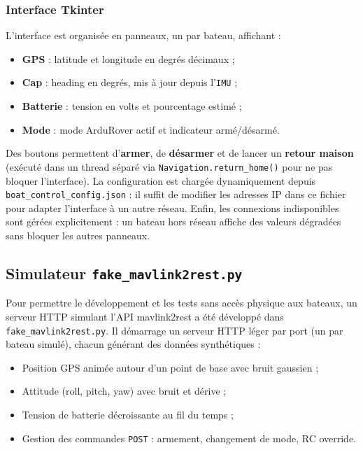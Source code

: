 \subsubsection{Interface Tkinter}

L'interface est organisée en panneaux, un par bateau, affichant :
\begin{itemize}
  \item \textbf{GPS} : latitude et longitude en degrés décimaux ;
  \item \textbf{Cap} : heading en degrés, mis à jour depuis l'\texttt{IMU} ;
  \item \textbf{Batterie} : tension en volts et pourcentage estimé ;
  \item \textbf{Mode} : mode ArduRover actif et indicateur armé/désarmé.
\end{itemize}

Des boutons permettent d'\textbf{armer}, de \textbf{désarmer} et de lancer un \textbf{retour maison} (exécuté dans un thread séparé via \texttt{Navigation.return\_home()} pour ne pas bloquer l'interface). La configuration est chargée dynamiquement depuis \texttt{boat\_control\_config.json} : il suffit de modifier les adresses IP dans ce fichier pour adapter l'interface à un autre réseau. Enfin, les connexions indisponibles sont gérées explicitement : un bateau hors réseau affiche des valeurs dégradées sans bloquer les autres panneaux.

\subsection{Simulateur \texttt{fake\_mavlink2rest.py}}
\label{sec:bblib:fake}

Pour permettre le développement et les tests sans accès physique aux bateaux, un serveur HTTP simulant l'API mavlink2rest a été développé dans \texttt{fake\_mavlink2rest.py}. Il démarrage un serveur HTTP léger par port (un par bateau simulé), chacun générant des données synthétiques :
\begin{itemize}
  \item Position GPS animée autour d'un point de base avec bruit gaussien ;
  \item Attitude (roll, pitch, yaw) avec bruit et dérive ;
  \item Tension de batterie décroissante au fil du temps ;
  \item Gestion des commandes \texttt{POST} : armement, changement de mode, RC override.
\end{itemize}

